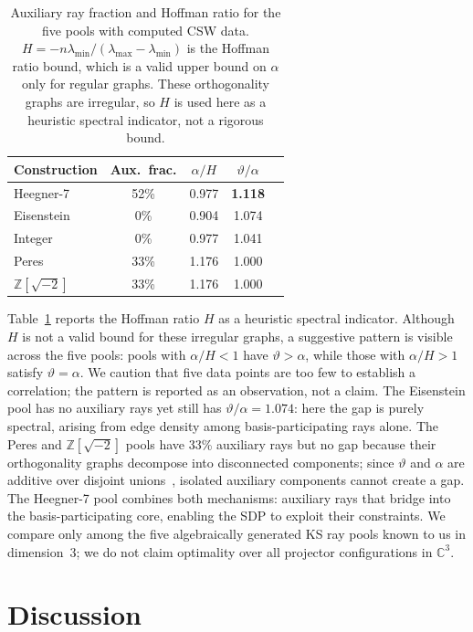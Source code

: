 \documentclass[twocolumn,prl,superscriptaddress,nofootinbib]{revtex4-2}
\newcommand{\C}{\mathbb{C}}
\newcommand{\Z}{\mathbb{Z}}
\begin{document}
\begin{table}[t]
\centering
\caption{Auxiliary ray fraction and Hoffman ratio for the five pools with computed CSW data. $H = -n\lambda_{\min}/(\lambda_{\max} - \lambda_{\min})$ is the Hoffman ratio bound, which is a valid upper bound on $\alpha$ only for regular graphs. These orthogonality graphs are irregular, so $H$ is used here as a heuristic spectral indicator, not a rigorous bound.}
\label{tab:mechanism}
\begin{tabular}{lcccc}
\toprule
Construction & Aux.\ frac. & $\alpha/H$ & $\vartheta/\alpha$ \\
\midrule
Heegner-7 & 52\% & 0.977 & \textbf{1.118} \\
Eisenstein & 0\% & 0.904 & 1.074 \\
Integer & 0\% & 0.977 & 1.041 \\
Peres & 33\% & 1.176 & 1.000 \\
$\Z[\sqrt{-2}]$ & 33\% & 1.176 & 1.000 \\
\bottomrule
\end{tabular}
\end{table}

Table~\ref{tab:mechanism} reports the Hoffman ratio $H$ as a heuristic spectral indicator. Although $H$ is not a valid bound for these irregular graphs, a suggestive pattern is visible across the five pools: pools with $\alpha/H < 1$ have $\vartheta > \alpha$, while those with $\alpha/H > 1$ satisfy $\vartheta = \alpha$.  We caution that five data points are too few to establish a correlation; the pattern is reported as an observation, not a claim. The Eisenstein pool has no auxiliary rays yet still has $\vartheta/\alpha = 1.074$: here the gap is purely spectral, arising from edge density among basis-participating rays alone. The Peres and $\Z[\sqrt{-2}]$ pools have 33\% auxiliary rays but no gap because their orthogonality graphs decompose into disconnected components; since $\vartheta$ and $\alpha$ are additive over disjoint unions~\cite{Knuth1994}, isolated auxiliary components cannot create a gap. The Heegner-7 pool combines both mechanisms: auxiliary rays that bridge into the basis-participating core, enabling the SDP to exploit their constraints. We compare only among the five algebraically generated KS ray pools known to us in dimension~3; we do not claim optimality over all projector configurations in $\C^3$.

\section{Discussion}
\end{document}

